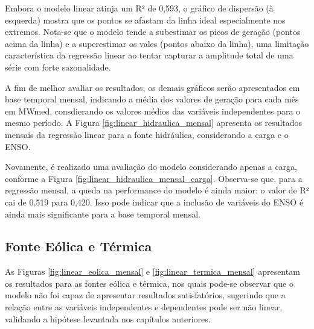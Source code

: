 \begin{figure}[!ht]
  {}
  {}
\end{figure}

Embora o modelo linear atinja um R² de 0,593, o gráfico de dispersão (à esquerda) mostra que os pontos se 
afastam da linha ideal especialmente nos extremos. Nota-se que o modelo tende a subestimar os picos de geração 
(pontos acima da linha) e a superestimar os vales (pontos abaixo da linha), uma limitação característica da regressão 
linear ao tentar capturar a amplitude total de uma série com forte sazonalidade.

A fim de melhor avaliar os resultados, os demais gráficos serão apresentados em base temporal mensal, indicando a média 
dos valores de geração para cada mês em MWmed, consdierando os valores médios das variáveis independentes para o mesmo período. 
A Figura \ref{fig:linear_hidraulica_mensal} apresenta os resultados mensais da regressão linear para a fonte hidráulica, 
considerando a carga e o ENSO. 

\begin{figure}[!ht]
  {}
  {}
\end{figure}
\begin{figure}[!ht]
  {}
  {}
\end{figure}

Novamente, é realizado uma avaliação do modelo considerando apenas a carga, conforme a Figura 
\ref{fig:linear_hidraulica_mensal_carga}. Observa-se que, para a regressão mensal, a queda na performance do modelo é ainda
maior: o valor de R² cai de 0,519 para 0,420. Isso pode indicar que a inclusão de variáveis do ENSO é ainda mais significante 
para a base temporal mensal.

\subsection{Fonte Eólica e Térmica}
As Figuras \ref{fig:linear_eolica_mensal} e \ref{fig:linear_termica_mensal} apresentam os resultados para as fontes eólica 
e térmica, nos quais pode-se observar que o modelo não foi capaz de apresentar resultados satisfatórios, sugerindo
que a relação entre as variáveis independentes e dependentes pode ser não linear, validando a hipótese levantada nos capítulos
anteriores.

